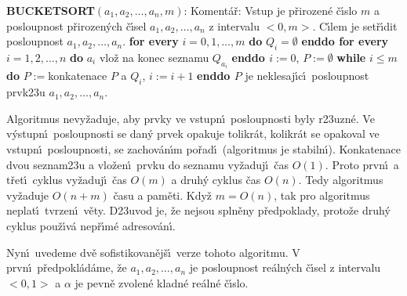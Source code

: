 {\bf BUCKETSORT$\left(a_1,a_2,\dots,a_n,m\right)$}:\newline 
Koment\'a\v r: Vstup je p\v rirozen\'e \v c\'\i slo $m$ a posloupnost 
p\v riroze\-n\'ych \v c\'\i sel $a_1,a_2,\dots,a_n$ z intervalu $
<0,m>$. 
C\'\i lem je set\v r\'\i dit posloupnost $a_1,a_2,\dots,a_n$.\newline 
{\bf for every} $i=0,1,\dots,m$ {\bf do} $Q_i=\emptyset$ {\bf enddo\newline 
for every} $i=1,2,\dots,n$ {\bf do}\newline 
\phantom{---}$a_i$ vlo\v z na konec seznamu $Q_{a_i}$\newline 
{\bf enddo\newline 
$i:=0$}, $P:=\emptyset$\newline
{\bf while} $i\le m$ {\bf do}\newline 
\phantom{---}$P:=$konkatenace $P$ a $Q_i$, $i:=i+1$\newline 
{\bf enddo\newline 
$P$} je neklesaj\'\i c\'\i\ posloupnost prvk\accent23u 
$a_1,a_2,\dots,a_n$.
\medskip

\flushpar Algoritmus nevy\v zaduje, aby prvky ve vstupn\'\i\ 
posloupnosti by\-ly r\accent23uzn\'e.  Ve v\'ystupn\'\i\ posloupnosti se 
dan\'y prvek opakuje tolikr\'at, kolikr\'at se opakoval ve vstupn\'\i\ 
posloupnosti, se zachov\'an\'\i m po\v rad\'\i\ (algoritmus je 
stabiln\'\i ).  Konkatenace dvou 
seznam\accent23u a vlo\v zen\'\i\ prvku do seznamu vy\v zaduj\'\i\ \v cas $
O\left(1\right)$.  
Proto prvn\'\i\ a t\v ret\'\i\ cyklus vy\v zaduj\'\i\ \v cas $O\left(m
\right)$ a druh\'y cyklus 
\v cas $O\left(n\right)$.  Tedy algoritmus vy\v zaduje $O\left(n+m\right)$ \v casu a pam\v eti.  
Kdy\v z $m=O\left(n\right)$, tak pro algoritmus neplat\'\i\ tvrzen\'\i\ v\v ety.  
D\accent23uvod je, \v ze nejsou spln\v eny p\v redpoklady, proto\v ze 
druh\'y cyklus pou\v z\'\i v\'a nep\v r\'\i m\'e adresov\'an\'\i .  
\medskip

\flushpar Nyn\'\i\ uvedeme dv\v e sofistikovan\v ej\v s\'\i\ verze tohoto 
algoritmu. V prvn\'\i\ p\v redpokl\'ad\'ame, \v ze 
$a_1,a_2,\dots,a_n$ je posloupnost re\'aln\'ych 
\v c\'\i sel z intervalu $<0,1>$ a $\alpha$ je pevn\v e zvolen\'e kladn\'e 
re\'aln\'e \v c\'\i slo.
\medskip

